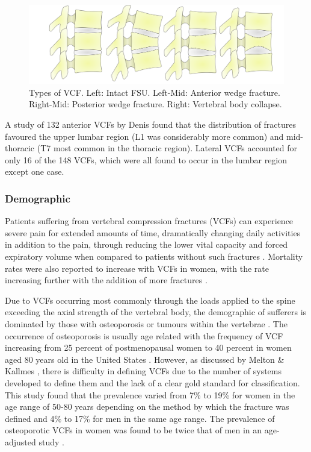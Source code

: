 \begin{figure}[hbt]
\centering
  \includegraphics[width=\textwidth]{Chapters/Chapter_Lit_images/type_of_fracture}
  \caption{Types of VCF. Left: Intact FSU. Left-Mid: Anterior wedge fracture. Right-Mid: Posterior wedge fracture. Right: Vertebral body collapse. }
\end{figure}





A study of 132 anterior VCFs by Denis \cite{Denis1983} found that the
distribution of fractures favoured the upper lumbar region (L1 was
considerably more common) and mid-thoracic (T7 most common in the
thoracic region). Lateral VCFs accounted for only 16 of the 148 VCFs,
which were all found to occur in the lumbar region except one case.

\subsubsection{Demographic}

Patients suffering from vertebral compression fractures (VCFs) can
experience severe pain for extended amounts of time, dramatically
changing daily activities in addition to the pain, through reducing the lower vital capacity and forced expiratory volume when compared to patients without
such fractures \cite{Mathis2001}. Mortality rates were also reported to increase
with
VCFs in women, with the rate increasing further with the addition of
more fractures \cite{Mathis2001}.

Due to VCFs occurring most commonly through the loads applied to the
spine exceeding the axial strength of the vertebral body, the
demographic of sufferers is dominated by those with osteoporosis or
tumours within the vertebrae \cite{Mathis2001}. The occurrence of osteoporosis
is
usually age related with the frequency of VCF increasing from 25 percent
of postmenopausal women to 40 percent in women aged 80 years old in the
United States \cite{Studies2006}. However, as discussed by Melton \& Kallmes
\cite{MeltonIII2006}, there is difficulty in defining VCFs due to the number
of
systems developed to define them and the lack of a clear gold
standard for classification. This study found that the prevalence varied from 7\% to 19\%
for women in the age range of 50-80 years depending on the method by
which the fracture was defined and 4\% to 17\% for men in the same age
range. The prevalence of osteoporotic VCFs in women was found to be
twice that of men in an age-adjusted study \cite{Cooper1992}.

